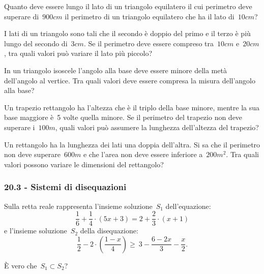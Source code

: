 \begin{multicols}{2}
 \begin{esercizio}[\Ast]
 \label{ese:20.28}
 Quanto deve essere lungo il lato di un triangolo equilatero il cui
perimetro deve superare di~$900\unit{cm}$ il perimetro di un triangolo
equilatero che ha il lato di~$10\unit{cm}$?
 \end{esercizio}

 \begin{esercizio}[\Ast]
 \label{ese:20.29}
 I lati di un triangolo sono tali che il secondo è doppio del primo e
il terzo è più lungo del secondo di~$3\unit{cm}$. Se il perimetro deve
essere compreso tra~$10\unit{cm}$ e~$20\unit{cm}$, tra quali valori può variare il lato
più piccolo?
 \end{esercizio}

 \begin{esercizio}[\Ast]
 \label{ese:20.30}
 In un triangolo isoscele l'angolo
alla base deve essere minore della metà dell'angolo
al vertice. Tra quali valori deve essere compresa la misura
dell'angolo alla base?
 \end{esercizio}

 \begin{esercizio}[\Ast]
 \label{ese:20.31}
 Un trapezio rettangolo ha l'altezza che è il triplo
della base minore, mentre la sua base maggiore è~5 volte quella minore.
Se il perimetro del trapezio non deve superare i~$100\unit{m}$, quali valori
può assumere la lunghezza dell'altezza del
trapezio?
 \end{esercizio}

 \begin{esercizio}[\Ast]
 \label{ese:20.32}
 Un rettangolo ha la lunghezza dei lati una doppia dell'altra.
Si sa che il perimetro non deve superare~$600\unit{m}$ e che
l'area non deve essere inferiore a~$200\unit{m^2}$. Tra quali
valori possono variare le dimensioni del rettangolo?
 \end{esercizio}
\end{multicols}
\pagebreak
 \subsubsection*{20.3 - Sistemi di disequazioni}

\begin{esercizio}
 \label{ese:20.33}
Sulla retta reale rappresenta l'insieme soluzione~$S_{1}$
dell'equazione:
\[\frac{1}{6}+\frac{1}{4}\cdot (5x+3)=2+\frac{2}{3}\cdot (x+1)\]
e l'insieme soluzione~$S_{2}$ della disequazione:
\[\frac{1}{2}-2\cdot\left(\frac{1-x}{4}\right)\ge~3-\frac{6-2x}{3}-\frac{x}{2}.\]

È vero che~$S_{1}\subset S_{2}$?
\end{esercizio}

